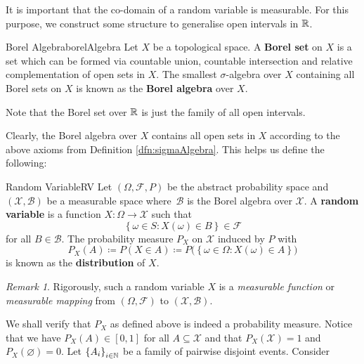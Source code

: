 \documentclass[math, code]{amznotes}
\theoremstyle{remark}
\newtheorem*{remark}{Remark}
\begin{document}
It is important that the co-domain of a random variable is measurable. For this purpose, we construct some structure to generalise open intervals in $\mathbb{R}$.
\begin{dfnbox}{Borel Algebra}{borelAlgebra}
    Let $X$ be a topological space. A {\color{red} \textbf{Borel set}} on $X$ is a set which can be formed via countable union, countable intersection and relative complementation of open sets in $X$. The smallest $\sigma$-algebra over $X$ containing all Borel sets on $X$ is known as the {\color{red} \textbf{Borel algebra}} over $X$.
\end{dfnbox}
Note that the Borel set over $\mathbb{R}$ is just the family of all open intervals. 

Clearly, the Borel algebra over $X$ contains all open sets in $X$ according to the above axioms from Definition \ref{dfn:sigmaAlgebra}. This helps us define the following:
\begin{dfnbox}{Random Variable}{RV}
    Let $\left(\Omega, \mathcal{F}, P\right)$ be the abstract probability space and $\left(\mathcal{X}, \mathcal{B}\right)$ be a measurable space where~$\mathcal{B}$ is the Borel algebra over $\mathcal{X}$. A {\color{red} \textbf{random variable}} is a function $X \colon \Omega \to \mathcal{X}$ such that 
    \begin{equation*}
        \left\{\omega \in S \colon X\left(\omega\right) \in B\right\} \in \mathcal{F} 
    \end{equation*}
    for all $B \in \mathcal{B}$. The probability measure $P_X$ on $\mathcal{X}$ induced by $P$ with 
    \begin{equation*}
        P_X\left(A\right) \coloneqq P\left(X \in A\right) \coloneqq P\bigl(\left\{\omega \in \Omega \colon X\left(\omega\right) \in A\right\}\bigr)
    \end{equation*}
    is known as the {\color{red} \textbf{distribution}} of $X$.
\end{dfnbox}
\begin{notebox}
    \begin{remark}
        Rigorously, such a random variable $X$ is a \textit{measurable function} or \textit{measurable mapping} from $\left(\Omega, \mathcal{F}\right)$ to $\left(\mathcal{X}, \mathcal{B}\right)$.
    \end{remark}
\end{notebox}
We shall verify that $P_X$ as defined above is indeed a probability measure. Notice that we have $P_X\left(A\right) \in \left[0, 1\right]$ for all $A \subseteq \mathcal{X}$ and that $P_X\left(\mathcal{X}\right) = 1$ and $P_X\left(\varnothing\right) = 0$. Let $\left\{A_i\right\}_{i \in \mathbb{N}}$ be a family of pairwise disjoint events. Consider 
\end{document}
